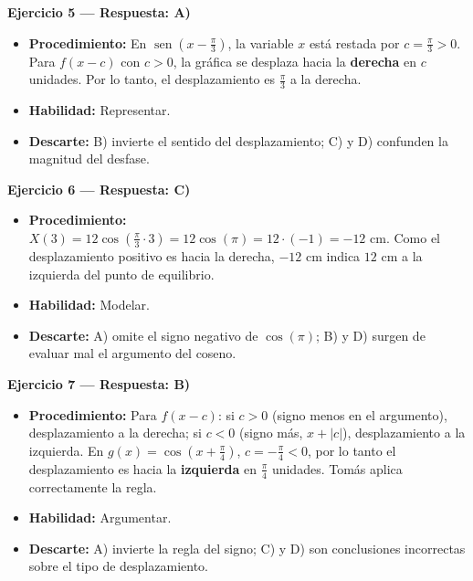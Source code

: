 \documentclass[12pt,letterpaper]{article}
\providecommand{\sen}{\operatorname{sen}}
\begin{document}
\textbf{Ejercicio 5 --- Respuesta: A)}
\begin{itemize}[leftmargin=*]
    \item \textbf{Procedimiento:} En $\sen\left(x-\frac{\pi}{3}\right)$, la variable $x$ está restada por $c=\frac{\pi}{3}>0$. Para $f(x-c)$ con $c>0$, la gráfica se desplaza hacia la \textbf{derecha} en $c$ unidades. Por lo tanto, el desplazamiento es $\frac{\pi}{3}$ a la derecha.
    \item \textbf{Habilidad:} Representar.
    \item \textbf{Descarte:} B) invierte el sentido del desplazamiento; C) y D) confunden la magnitud del desfase.
\end{itemize}

\vspace{1.2cm}

\textbf{Ejercicio 6 --- Respuesta: C)}
\begin{itemize}[leftmargin=*]
    \item \textbf{Procedimiento:} $X(3)=12\cos\left(\frac{\pi}{3}\cdot3\right)=12\cos(\pi)=12\cdot(-1)=-12\text{ cm}$. Como el desplazamiento positivo es hacia la derecha, $-12\text{ cm}$ indica $12\text{ cm}$ a la izquierda del punto de equilibrio.
    \item \textbf{Habilidad:} Modelar.
    \item \textbf{Descarte:} A) omite el signo negativo de $\cos(\pi)$; B) y D) surgen de evaluar mal el argumento del coseno.
\end{itemize}

\vspace{1.2cm}

\textbf{Ejercicio 7 --- Respuesta: B)}
\begin{itemize}[leftmargin=*]
    \item \textbf{Procedimiento:} Para $f(x-c)$: si $c>0$ (signo menos en el argumento), desplazamiento a la derecha; si $c<0$ (signo más, $x+|c|$), desplazamiento a la izquierda. En $g(x)=\cos\left(x+\frac{\pi}{4}\right)$, $c=-\frac{\pi}{4}<0$, por lo tanto el desplazamiento es hacia la \textbf{izquierda} en $\frac{\pi}{4}$ unidades. Tomás aplica correctamente la regla.
    \item \textbf{Habilidad:} Argumentar.
    \item \textbf{Descarte:} A) invierte la regla del signo; C) y D) son conclusiones incorrectas sobre el tipo de desplazamiento.
\end{itemize}

\vspace{1.2cm}
\end{document}

